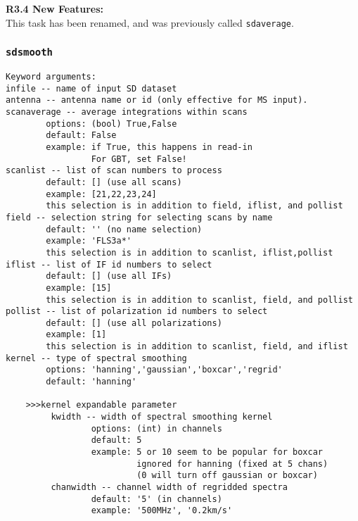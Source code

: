 \medskip
{\bf R3.4 New Features:}\\
This task has been renamed, and was previously called {\tt sdaverage}.

\subsubsection{{\tt sdsmooth}}
\label{section:sd.sdtasks.tasks.sdsmooth}

\begin{verbatim}
Keyword arguments:
infile -- name of input SD dataset
antenna -- antenna name or id (only effective for MS input). 
scanaverage -- average integrations within scans
        options: (bool) True,False
        default: False
        example: if True, this happens in read-in
                 For GBT, set False!
scanlist -- list of scan numbers to process
        default: [] (use all scans)
        example: [21,22,23,24]
        this selection is in addition to field, iflist, and pollist
field -- selection string for selecting scans by name
        default: '' (no name selection)
        example: 'FLS3a*'
        this selection is in addition to scanlist, iflist,pollist
iflist -- list of IF id numbers to select
        default: [] (use all IFs)
        example: [15]
        this selection is in addition to scanlist, field, and pollist
pollist -- list of polarization id numbers to select
        default: [] (use all polarizations)
        example: [1]
        this selection is in addition to scanlist, field, and iflist
kernel -- type of spectral smoothing
        options: 'hanning','gaussian','boxcar','regrid'
        default: 'hanning'

    >>>kernel expandable parameter
         kwidth -- width of spectral smoothing kernel
                 options: (int) in channels 
                 default: 5
                 example: 5 or 10 seem to be popular for boxcar
                          ignored for hanning (fixed at 5 chans)
                          (0 will turn off gaussian or boxcar)
         chanwidth -- channel width of regridded spectra
                 default: '5' (in channels)
                 example: '500MHz', '0.2km/s'


\end{verbatim}
